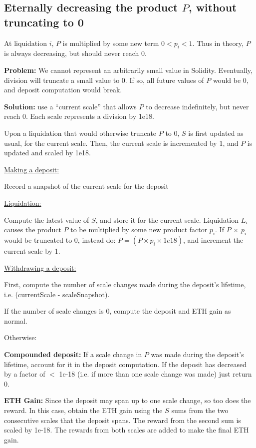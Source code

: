 \documentclass[reqno]{article}
\begin{document}
\bigskip
\subsection{Eternally decreasing the product $P$, without truncating to 0}

\bigskip
At liquidation $i$, $P$ is multiplied by some new term $0 < p_i <1$. Thus in theory, $P$ is always decreasing, but should never reach 0. 

\bigskip
\textbf{Problem:} We cannot represent an arbitrarily small value in Solidity.  Eventually, division will truncate a small value to 0. If so, all future values of $P$ would be 0, and deposit computation would break.

\bigskip
\textbf{Solution:} use a “current scale” that allows $P$ to decrease indefinitely, but never reach 0. Each scale represents a division by 1e18.  

\bigskip
Upon a liquidation that would otherwise truncate $P$ to 0, $S$ is first updated as usual, for the current scale. Then, the current scale is incremented by 1, and $P$ is updated and scaled by 1e18.

\bigskip
\underline{Making a deposit:}

Record a snapshot of the current scale for the deposit

\bigskip
\underline{Liquidation:}

Compute the latest value of $S$, and store it for the current scale.
Liquidation $L_i$ causes the product $P$ to be multiplied by some new product factor $p_i$.  If $P$ $\times$ $p_i$ would be truncated to 0, instead do: $P = (P \times p_i \times 1e18)$, and increment the current scale by 1.

\bigskip
\underline{Withdrawing a deposit:}

First, compute the number of scale changes made during the deposit’s lifetime, i.e. (currentScale - scaleSnapshot).

\bigskip
If the number of scale changes is 0, compute the deposit and ETH gain as normal.

\bigskip
Otherwise:

\bigskip
\textbf{Compounded deposit:} If a scale change in $P$ was made during the deposit's lifetime, account for it in the deposit computation. If the deposit has decreased by a factor of $<$ 1e-18 (i.e. if more than one scale change was made) just return 0.

\bigskip
\textbf{ETH Gain:} Since the deposit may span up to one scale change, so too does the reward. In this case, obtain the ETH gain using the $S$ sums from the two consecutive scales that the deposit spans. The reward from the second sum is scaled by 1e-18. The rewards from both scales are added to make the final ETH gain.
\end{document}
